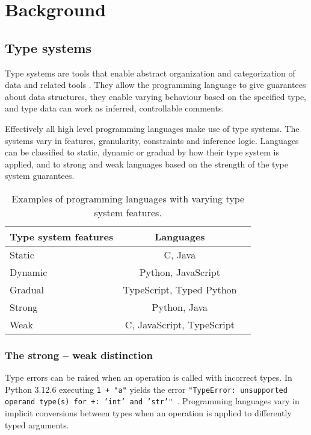 \chapter{Background\label{background}}

\section{Type systems}

Type systems are tools that enable abstract organization and categorization of data and related tools \cite{programming_langs}. They allow the programming language to give guarantees about data structures, they enable varying behaviour based on the specified type, and type data can work as inferred, controllable comments.

Effectively all high level programming languages make use of type systems. The systems vary in features, granularity, constraints and inference logic. Languages can be classified to static, dynamic or gradual by how their type system is applied, and to strong and weak languages based on the strength of the type system guarantees.

\begin{table}[h!]
    \centering
    \begin{tabular}{@{}lcl@{}}
    \toprule
    Type system features       & Languages      \\ \midrule
    Static          & C,  Java           \\
    Dynamic         & Python, JavaScript \\ 
    Gradual         & TypeScript, Typed Python \\ \midrule
    Strong          & Python, Java \\
    Weak            & C, JavaScript, TypeScript  \\ \bottomrule
    \end{tabular}
    \caption{Examples of programming languages with varying type system features.}
    \label{table:1}
\end{table}

\subsection{The strong -- weak distinction}
Type errors can be raised when an operation is called with incorrect types. In Python 3.12.6 executing {\tt 1 + "a"} yields the error {\tt "TypeError: unsupported operand type(s) for +: 'int' and 'str'" }. Programming languages vary in implicit conversions between types when an operation is applied to differently typed arguments. 

